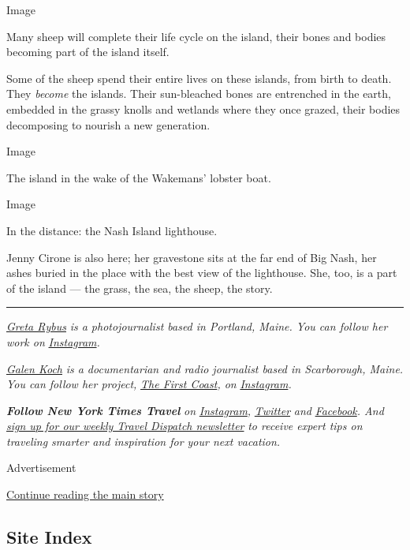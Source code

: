 Image

Many sheep will complete their life cycle on the island, their bones and
bodies becoming part of the island itself.

Some of the sheep spend their entire lives on these islands, from birth
to death. They \emph{become} the islands. Their sun-bleached bones are
entrenched in the earth, embedded in the grassy knolls and wetlands
where they once grazed, their bodies decomposing to nourish a new
generation.

Image

The island in the wake of the Wakemans' lobster boat.

Image

In the distance: the Nash Island lighthouse.

Jenny Cirone is also here; her gravestone sits at the far end of Big
Nash, her ashes buried in the place with the best view of the
lighthouse. She, too, is a part of the island --- the grass, the sea,
the sheep, the story.

\begin{center}\rule{0.5\linewidth}{\linethickness}\end{center}

\href{http://www.gretarybus.com/}{\emph{Greta Rybus}} \emph{is a
photojournalist based in Portland, Maine. You can follow her work on}
\href{https://www.instagram.com/gretarybus/}{\emph{Instagram}}\emph{.}

\href{http://www.galenkoch.com/}{\emph{Galen Koch}} \emph{is a
documentarian and radio journalist based in Scarborough, Maine. You can
follow her project,} \href{http://www.thefirstcoast.org/}{\emph{The
First Coast}}\emph{, on}
\href{https://www.instagram.com/thefirstcoast/?hl=en}{\emph{Instagram}}\emph{.}

\emph{\textbf{Follow New York Times Travel}} \emph{on}
\href{https://www.instagram.com/nytimestravel/}{\emph{Instagram}}\emph{,}
\href{https://twitter.com/nytimestravel}{\emph{Twitter}} \emph{and}
\href{https://www.facebook.com/nytimestravel/}{\emph{Facebook}}\emph{.
And}
\href{https://www.nytimes.com/newsletters/traveldispatch}{\emph{sign up
for our weekly Travel Dispatch newsletter}} \emph{to receive expert tips
on traveling smarter and inspiration for your next vacation.}

Advertisement

\protect\hyperlink{after-bottom}{Continue reading the main story}

\hypertarget{site-index}{%
\subsection{Site Index}\label{site-index}}

